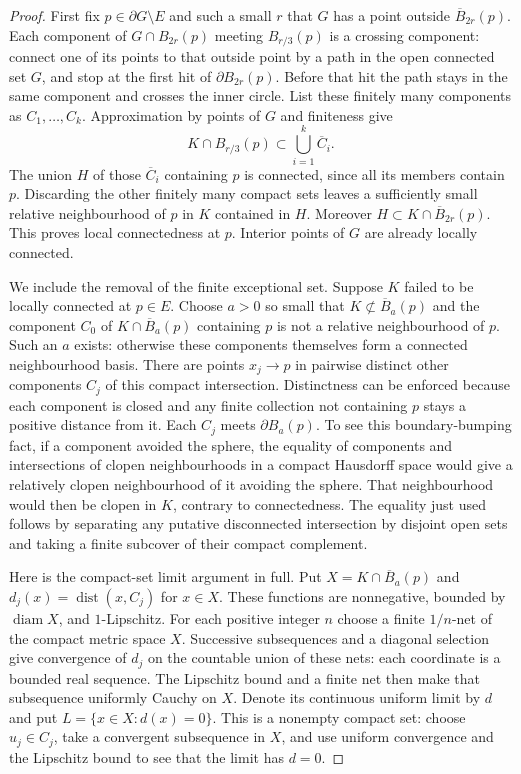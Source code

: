 \documentclass[12pt]{amsart}
\numberwithin{equation}{section}
\begin{document}
	\begin{proof}
First fix $p\in\partial G\setminus E$ and such a small $r$
that $G$ has a point outside $\overline B_{2r}(p)$.
Each component of $G\cap B_{2r}(p)$ meeting $B_{r/3}(p)$
is a crossing component: connect one of its points to that
outside point by a path in the open connected set $G$, and
stop at the first hit of $\partial B_{2r}(p)$.
Before that hit the path stays in the same component and
crosses the inner circle. List these finitely many components
as $C_1,\ldots,C_k$. Approximation by points of $G$ and finiteness
give
\[
 K\cap B_{r/3}(p)\subset\bigcup_{i=1}^k\overline C_i.
\]
The union $H$ of those $\overline C_i$ containing $p$ is
connected, since all its members contain $p$. Discarding the
other finitely many compact sets leaves a sufficiently small
relative neighbourhood of $p$ in $K$ contained in $H$.
Moreover $H\subset K\cap\overline B_{2r}(p)$.
This proves local connectedness at $p$. Interior points of $G$
are already locally connected.

We include the removal of the finite exceptional set. Suppose
$K$ failed to be locally connected at $p\in E$. Choose $a>0$
so small that $K\not\subset\overline B_a(p)$ and the component
$C_0$ of $K\cap\overline B_a(p)$ containing $p$ is not a
relative neighbourhood of $p$. Such an $a$ exists: otherwise
these components themselves form a connected neighbourhood
basis. There are points $x_j\to p$ in pairwise distinct other
components $C_j$ of this compact intersection. Distinctness
can be enforced because each component is closed and any
finite collection not containing $p$ stays a positive distance
from it. Each $C_j$ meets $\partial B_a(p)$. To see this
boundary-bumping fact, if a component avoided the sphere,
the equality of components and intersections of clopen
neighbourhoods in a compact Hausdorff space would give a
relatively clopen neighbourhood of it avoiding the sphere.
That neighbourhood would then be clopen in $K$, contrary to
connectedness. The equality just used follows by separating
any putative disconnected intersection by disjoint open sets
and taking a finite subcover of their compact complement.

Here is the compact-set limit argument in full. Put
$X=K\cap\overline B_a(p)$ and $d_j(x)=\operatorname{dist}(x,C_j)$
for $x\in X$. These functions are nonnegative, bounded by
$\operatorname{diam}X$, and $1$-Lipschitz. For each positive
integer $n$ choose a finite $1/n$-net of the compact metric
space $X$. Successive subsequences and a diagonal selection
give convergence of $d_j$ on the countable union of these
nets: each coordinate is a bounded real sequence.
The Lipschitz bound and a finite net then make that subsequence
uniformly Cauchy on $X$. Denote its continuous uniform limit
by $d$ and put $L=\{x\in X:d(x)=0\}$. This is a nonempty
compact set: choose $u_j\in C_j$, take a convergent subsequence
in $X$, and use uniform convergence and the Lipschitz bound
to see that the limit has $d=0$.


\end{proof}
\end{document}
